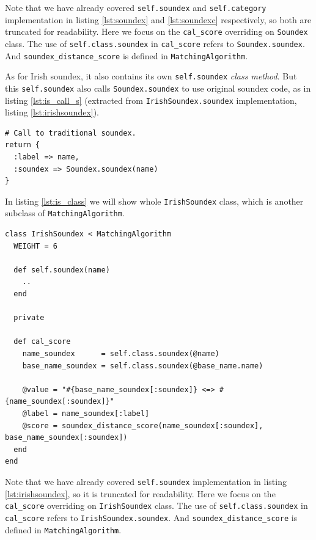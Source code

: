 Note that we have already covered \texttt{self.soundex} and \texttt{self.category} implementation
in listing \ref{lst:soundex} and \ref{lst:soundexc} respectively, so both
are truncated for readability. Here we focus on the \texttt{cal\_score} overriding
on \texttt{Soundex} class. The use of \texttt{self.class.soundex} in \texttt{cal\_score}
refers to \texttt{Soundex.soundex}. And \texttt{soundex\_distance\_score}
is defined in \texttt{MatchingAlgorithm}.

As for Irish soundex, it also contains its own \texttt{self.soundex}
\emph{class method}. But this \texttt{self.soundex} also calls \texttt{Soundex.soundex}
to use original soundex code, as in listing \ref{lst:is_call_s} (extracted from
\texttt{IrishSoundex.soundex} implementation, listing \ref{lst:irishsoundex}).

\begin{minipage}{\linewidth}
\begin{lstlisting}[label={lst:is_call_s}, caption={\texttt{IrishSoundex.soundex} calls to \texttt{Soundex.soundex}.}]
# Call to traditional soundex.
return {
  :label => name,
  :soundex => Soundex.soundex(name)
}
\end{lstlisting}
\end{minipage}

In listing \ref{lst:is_class} we will show whole \texttt{IrishSoundex} class,
which is another subclass of \texttt{MatchingAlgorithm}.

\begin{minipage}{\linewidth}
  \begin{lstlisting}[label={lst:is_class}, caption={\texttt{IrishSoundex} class.}]
class IrishSoundex < MatchingAlgorithm
  WEIGHT = 6

  def self.soundex(name)
    ..
  end

  private

  def cal_score
    name_soundex      = self.class.soundex(@name)
    base_name_soundex = self.class.soundex(@base_name.name)

    @value = "#{base_name_soundex[:soundex]} <=> #{name_soundex[:soundex]}"
    @label = name_soundex[:label]
    @score = soundex_distance_score(name_soundex[:soundex], base_name_soundex[:soundex])
  end
end
\end{lstlisting}
\end{minipage}

Note that we have already covered \texttt{self.soundex} implementation
in listing \ref{lst:irishsoundex}, so it is truncated for readability.
Here we focus on the \texttt{cal\_score} overriding
on \texttt{IrishSoundex} class. The use of \texttt{self.class.soundex} in \texttt{cal\_score}
refers to \texttt{IrishSoundex.soundex}. And \texttt{soundex\_distance\_score}
is defined in \texttt{MatchingAlgorithm}.

